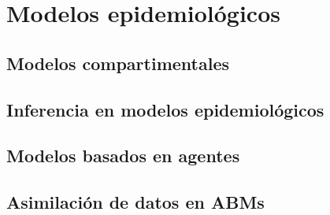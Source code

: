 \chapter{Modelos epidemiológicos}
\section{Modelos compartimentales}
\section{Inferencia en modelos epidemiológicos}
\section{Modelos basados en agentes}
\section{Asimilación de datos en ABMs}
